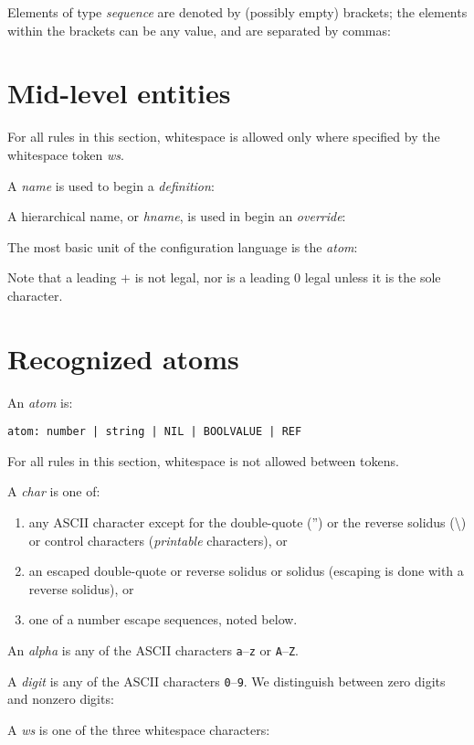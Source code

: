 \documentclass{memarticle}
\begin{document}
Elements of type \emph{sequence} are denoted by (possibly empty) brackets;
the elements within the brackets can be any value,
and are separated by commas:

\section{Mid-level entities}

For all rules in this section,
whitespace is allowed only where specified by the whitespace token \emph{ws}.

A \emph{name} is used to begin a \emph{definition}:

\break
A hierarchical name,
or \emph{hname},
is used in begin an \emph{override}:

The most basic unit of the configuration language is the \emph{atom}:

Note that a leading $+$ is not legal,
nor is a leading 0 legal unless it is the sole character.

\section{Recognized atoms}

An \emph{atom} is: 
\begin{verbatim}
atom: number | string | NIL | BOOLVALUE | REF
\end{verbatim}


For all rules in this section,
whitespace is not allowed between tokens.

A \emph{char} is one of:
\begin{enumerate}
\item any ASCII character except for
the double-quote ('') 
or the reverse solidus (\textbackslash)
or control characters
(\emph{printable} characters), or
\item an escaped double-quote or reverse solidus or solidus
(escaping is done with a reverse solidus), or
\item one of a number escape sequences, noted below.
\end{enumerate}

An \emph{alpha} is any of the ASCII characters \texttt{a}--\texttt{z}
or \texttt{A}--\texttt{Z}.

A \emph{digit} is any of the ASCII characters \texttt{0}--\texttt{9}.
We distinguish between zero digits and nonzero digits:

A \emph{ws} is one of the three whitespace characters:
\end{document}
